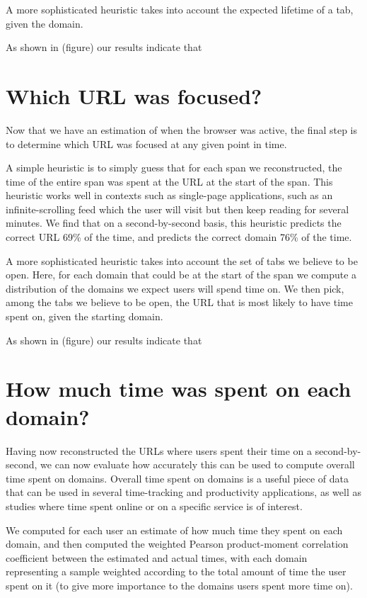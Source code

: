 \documentclass{sigchi}
\begin{document}
A more sophisticated heuristic takes into account the expected lifetime of a tab, given the domain.

As shown in (figure) our results indicate that 

\section{Which URL was focused?}

Now that we have an estimation of when the browser was active, the final step is to determine which URL was focused at any given point in time.

A simple heuristic is to simply guess that for each span we reconstructed, the time of the entire span was spent at the URL at the start of the span. This heuristic works well in contexts such as single-page applications, such as an infinite-scrolling feed which the user will visit but then keep reading for several minutes. We find that on a second-by-second basis, this heuristic predicts the correct URL 69\% of the time, and predicts the correct domain 76\% of the time.

A more sophisticated heuristic takes into account the set of tabs we believe to be open. Here, for each domain that could be at the start of the span we compute a distribution of the domains we expect users will spend time on. We then pick, among the tabs we believe to be open, the URL that is most likely to have time spent on, given the starting domain.

As shown in (figure) our results indicate that 

\section{How much time was spent on each domain?}

Having now reconstructed the URLs where users spent their time on a second-by-second, we can now evaluate how accurately this can be used to compute overall time spent on domains. Overall time spent on domains is a useful piece of data that can be used in several time-tracking and productivity applications, as well as studies where time spent online or on a specific service is of interest.

We computed for each user an estimate of how much time they spent on each domain, and then computed the weighted Pearson product-moment correlation coefficient between the estimated and actual times, with each domain representing a sample weighted according to the total amount of time the user spent on it (to give more importance to the domains users spent more time on).
\end{document}
